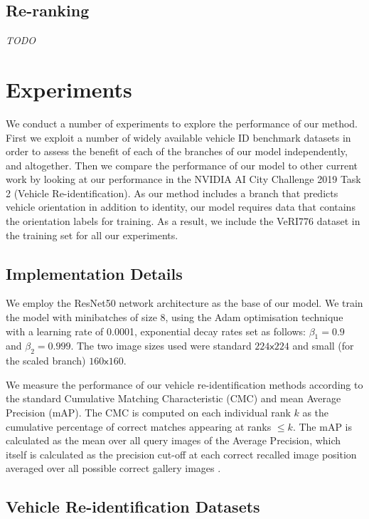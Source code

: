 \documentclass[10pt,twocolumn,letterpaper]{article}
\def\x{{\mathsf x}}
\begin{document}
\subsection{Re-ranking}

\emph{TODO}

\section{Experiments}

We conduct a number of experiments to explore the performance of our method. First we exploit a number of widely available vehicle ID benchmark datasets in order to assess the benefit of each of the branches of our model independently, and altogether. Then we compare the performance of our model to other current work by looking at our performance in the NVIDIA AI City Challenge 2019 Task 2 (Vehicle Re-identification). As our method includes a branch that predicts vehicle orientation in addition to identity, our model requires data that contains the orientation labels for training. As a result, we include the VeRI776 dataset \cite{liu2016veri} in the training set for all our experiments.

\subsection{Implementation Details}

We employ the ResNet50 \cite{} network architecture as the base of our model. We train the model with minibatches of size 8, using the Adam optimisation technique with a learning rate of 0.0001, exponential decay rates set as follows: $\beta_1=0.9$ and $\beta_2=0.999$. The two image sizes used were standard $224\x224$ and small (for the scaled branch) $160\x160$.

We measure the performance of our vehicle re-identification methods according to the standard Cumulative Matching Characteristic (CMC) and mean Average Precision (mAP). The CMC is computed on each individual rank $k$ as the cumulative percentage of correct matches appearing
at ranks $\leq k$. The mAP is calculated as the mean over all query images of the Average Precision, which itself is calculated as the precision cut-off at each correct recalled image position averaged over all possible correct gallery images \cite{}.

\subsection{Vehicle Re-identification Datasets}
\end{document}
